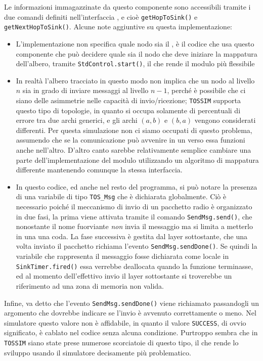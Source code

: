 \documentclass[twoside,11pt,a4paper,italian,openany]{book}
\newcommand{\tos}{\texttt{TOSSIM} }
\begin{document}
Le informazioni immagazzinate da questo componente sono accessibili tramite i due comandi 
definiti nell'interfaccia \treedata, e cioè \texttt{getHopToSink()} e \texttt{getNextHopToSink()}. 
Alcune note aggiuntive su questa implementazione:
\begin{itemize}
\item{L'implementazione non specifica quale nodo sia il \sink, è il codice che usa questo 
componente che può decidere quale sia il nodo che deve iniziare la mappatura dell'albero, 
tramite \texttt{StdControl.start()}, il che rende il modulo più flessibile}

\item{In realtà l'albero tracciato in questo modo non implica che un nodo al livello $n$ sia in 
grado di inviare messaggi al livello $n-1$, perché è possibile che ci siano delle asimmetrie 
nelle capacità di invio/ricezione; \tos supporta questo tipo di topologie, in quanto si 
occupa solamente di percentuali di errore tra due archi generici, e gli archi $(a,b)$ e $(b,a)$ 
vengono considerati differenti. Per questa simulazione non ci siamo occupati di questo problema,
assumendo che se la comunicazione può avvenire in un verso essa funzioni anche nell'altro. 
D'altro canto sarebbe relativamente semplice cambiare una parte dell'implementazione del modulo 
\tree utilizzando un algoritmo di mappatura differente mantenendo comunque la stessa 
interfaccia.}

\item{In questo codice, ed anche nel resto del programma, si può notare la presenza 
di una variabile di tipo \texttt{TOS\_Msg} che è dichiarata globalmente.
Ciò è necessario poiché il meccanismo di invio di un pacchetto radio è organizzato in due fasi, 
la prima viene attivata tramite il comando \texttt{SendMsg.send()}, che nonostante il nome 
fuorviante \emph{non} invia il messaggio ma si limita a metterlo in una una coda.
La fase successiva è gestita dal layer sottostante, che una volta inviato il pacchetto 
richiama l'evento \texttt{SendMsg.sendDone()}. 
Se quindi la variabile che rappresenta il messaggio fosse dichiarata come locale in 
\texttt{SinkTimer.fired()} essa verrebbe deallocata quando la funzione terminasse,  
ed al momento dell'effettivo invio il layer sottostante si troverebbe un riferimento 
ad una zona di memoria non valida. }
\end{itemize}

Infine, va detto che l'evento \texttt{SendMsg.sendDone()} viene richiamato passandogli un 
argomento che  dovrebbe indicare se l'invio è avvenuto correttamente o meno. 
Nel simulatore questo valore non è affidabile, in quanto il valore \texttt{SUCCESS}, di ovvio 
significato, è cablato nel codice senza alcuna condizione. 
Purtroppo sembra che in \tos siano state prese numerose scorciatoie di questo tipo, il che 
rende lo sviluppo usando il simulatore decisamente più problematico. 
\end{document}
